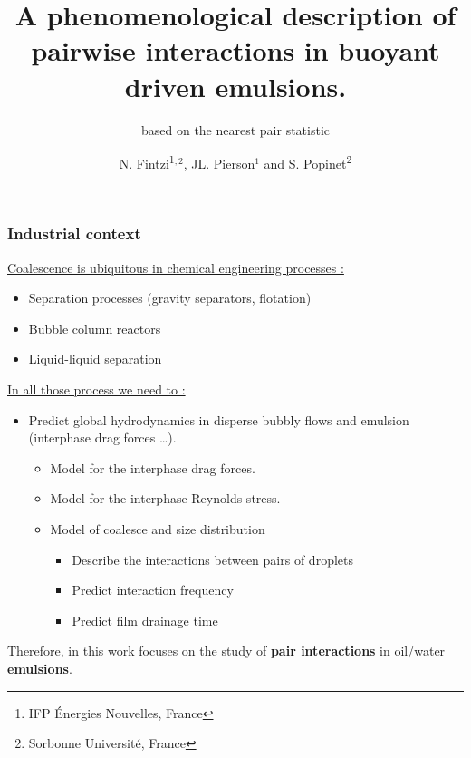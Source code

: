 \documentclass{sintefbeamer}
\title{A phenomenological description of pairwise interactions in buoyant driven emulsions.}
\subtitle{based on the nearest pair statistic}
\author{\href{http://basilisk.fr/sandbox/fintzin/Rising-Suspenion/RS.c}{\underline{N. Fintzi}\footnote{IFP \'Energies Nouvelles, France}$^{,2}$}, JL. Pierson$^1$ and S. Popinet\footnote{Sorbonne Universit\'e, France}}
\begin{document}
\maketitle

\begin{frame}
  \frametitle{Industrial context}
  \underline{Coalescence is ubiquitous in chemical engineering processes :}
  \begin{itemize}
    \item Separation processes (gravity separators, flotation)
    \item Bubble column reactors
    \item Liquid-liquid separation
  \end{itemize}
  \vfill
  \underline{In all those process we need to : }
  \begin{itemize}
    \item Predict global hydrodynamics in disperse bubbly flows and emulsion (interphase drag forces \ldots).
    \begin{itemize}
      \item Model for the interphase drag forces.
      \item Model for the interphase Reynolds stress.
      \item Model of coalesce and size distribution 
      \begin{itemize}
        \item Describe the interactions between pairs of droplets
        \item Predict interaction frequency
        \item Predict film drainage time 
      \end{itemize}
    \end{itemize}
  \end{itemize}

  \vfill

  Therefore, in this work focuses on the study of \textbf{pair interactions} in oil/water \textbf{emulsions}.
\end{frame}
\end{document}

